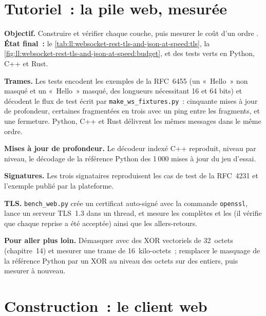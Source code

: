 \section{Tutoriel~: la pile web, mesurée}\label{tut:ll:websocket-rest-tls-and-json-at-speed:tut}

\begin{tutorial}
\textbf{Objectif.} Construire et vérifier chaque couche, puis mesurer le coût d'un ordre . \textbf{État final~:}
le \cref{tab:ll:websocket-rest-tls-and-json-at-speed:tls}, la \cref{fig:ll:websocket-rest-tls-and-json-at-speed:budget}, et
des tests verts en Python, C++ et Rust.
\begin{tutsteps}
\item \textbf{Trames.} Les tests encodent les exemples de la RFC~6455 (un «~Hello~» non masqué et un «~Hello~» masqué, des longueurs nécessitant 16 et 64
bits) et décodent le flux de test écrit par \texttt{make\_ws\_fixtures.py}~: cinquante mises à jour de profondeur, certaines fragmentées en trois
avec un ping entre les fragments, et une fermeture. Python, C++ et Rust délivrent les mêmes messages dans le même ordre.
\item \textbf{Mises à jour de profondeur.} Le décodeur indexé C++ reproduit, niveau par niveau, le décodage de la référence Python
des 1\,000 mises à jour du jeu d'essai.
\item \textbf{Signatures.} Les trois signataires reproduisent les cas de test de la RFC~4231 et l'exemple publié par la plateforme.
\item \textbf{TLS.} \texttt{bench\_web.py} crée un certificat auto-signé avec la commande \texttt{openssl}, lance un serveur TLS~1.3
dans un thread, et mesure les  complètes et les  (il vérifie que chaque reprise a été acceptée) ainsi que les allers-retours.
\end{tutsteps}
\textbf{Pour aller plus loin.} Démasquer avec des XOR vectoriels de 32~octets (chapitre~14) et mesurer une trame de 16~kilo-octets~; remplacer le
masquage de la référence Python par un XOR au niveau des octets sur des entiers, puis mesurer à nouveau.
\end{tutorial}

\section{Construction~: le client web}\label{bld:ll:websocket-rest-tls-and-json-at-speed:wsclient}

